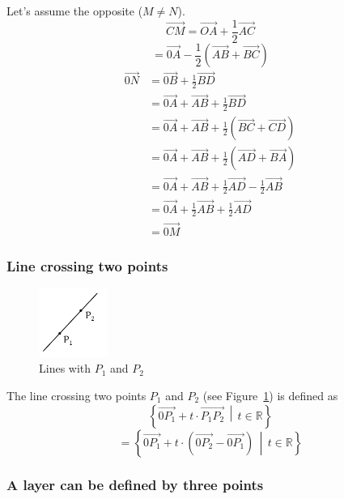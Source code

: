 \documentclass[a4paper,landscape,twocolumn]{article}
\newcommand\setdef[2]{\left\{#1\,\middle|\,#2\right\}}
\begin{document}
Let's assume the opposite ($M \neq N$).
\[ \overrightarrow{CM} = \overrightarrow{OA} + \frac12 \overrightarrow{AC} \]
\[ = \overrightarrow{0A} - \frac12 \left(\overrightarrow{AB} + \overrightarrow{BC}\right) \]
\begin{align*}
  \overrightarrow{0N} &= \overrightarrow{0B} + \frac12 \overrightarrow{BD} \\
    &= \overrightarrow{0A} + \overrightarrow{AB} + \frac12 \overrightarrow{BD} \\
    &= \overrightarrow{0A} + \overrightarrow{AB} + \frac12 \left(\overrightarrow{BC} + \overrightarrow{CD}\right) \\
    &= \overrightarrow{0A} + \overrightarrow{AB} + \frac12 \left(\overrightarrow{AD} + \overrightarrow{BA}\right) \\
    &= \overrightarrow{0A} + \overrightarrow{AB} + \frac12 \overrightarrow{AD} - \frac12 \overrightarrow{AB} \\
    &= \overrightarrow{0A} + \frac12 \overrightarrow{AB} + \frac12 \overrightarrow{AD} \\
    &= \overrightarrow{0M}
\end{align*}

\subsubsection{Line crossing two points}
%
\begin{figure}[!h]
  \begin{center}
    \includegraphics[width=0.2\textwidth]{img/line_with_P1_and_P2.pdf}
    \caption{Lines with $P_1$ and $P_2$}
    \label{img:line}
  \end{center}
\end{figure}
%
The line crossing two points $P_1$ and $P_2$ (see Figure~\ref{img:line}) is defined as
\[ \setdef{\overrightarrow{0P_1} + t \cdot \overrightarrow{P_1 P_2}}{t \in \mathbb{R}} \]
\[ = \setdef{\overrightarrow{0P_1} + t \cdot \left(\overrightarrow{0P_2} - \overrightarrow{0P_1}\right)}{t \in \mathbb{R}} \]

\subsubsection{A layer can be defined by three points}
\end{document}
